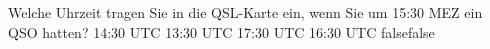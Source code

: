     {Welche Uhrzeit tragen Sie in die QSL-Karte ein, wenn Sie um 15:30 MEZ ein QSO hatten?}
    {14:30 UTC}
    {13:30 UTC}
    {17:30 UTC}
    {16:30 UTC}
    {false}{false}
